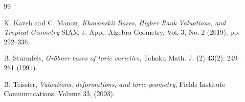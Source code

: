 \documentclass[12pt, a4article]{amsart}   	%
\numberwithin{equation}{section}
\theoremstyle{plain}
\theoremstyle{definition}
\begin{document}
\begin{thebibliography}{99}


K. Kaveh and C. Manon, 
\emph{Khovanskii Bases, Higher Rank Valuations, and Tropical Geometry}
SIAM J. Appl. Algebra Geometry, Vol. 3, No. 2 (2019), pp. 292--336.










B. Sturmfels,
\emph{Gr\"obner bases of toric varieties}, Tohoku Math. J. (2) 43(2): 249--261 (1991).


B. Teissier, 
\emph{Valuations, deformations, and toric geometry}, 
Fields Institute Communications, Volume 33, (2003).

\end{thebibliography}
\end{document}
